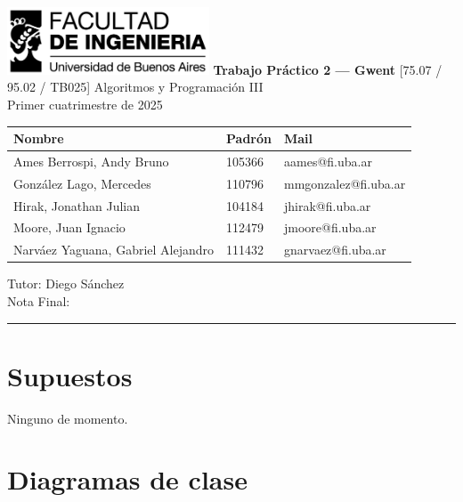\documentclass[titlepage,a4paper]{article}
\begin{document}
\begin{titlepage} %
	\hfill\includegraphics[width=6cm]{logofiuba.jpg}
    \centering
    \vfill
    \Huge \textbf{Trabajo Práctico 2 — Gwent}
    \vskip2cm
    \Large [75.07 / 95.02 / TB025] Algoritmos y Programación III\\
    Primer cuatrimestre de 2025 
    \vfill
    \begin{tabular}{ | l | l | l | }
      \hline
      \textbf{Nombre} & \textbf{Padrón} & \textbf{Mail} \\ \hline
      Ames Berrospi, Andy Bruno & 105366 & aames@fi.uba.ar \\ \hline
      González Lago, Mercedes & 110796 & mmgonzalez@fi.uba.ar \\ \hline
      Hirak, Jonathan Julian & 104184 & jhirak@fi.uba.ar \\ \hline
      Moore, Juan Ignacio & 112479 & jmoore@fi.uba.ar \\ \hline
      Narváez Yaguana, Gabriel Alejandro & 111432 & gnarvaez@fi.uba.ar \\ \hline
    \end{tabular}
    
    \vspace{1cm}
    \begin{flushleft}
    Tutor: Diego Sánchez \\
    \vspace{0.5cm}
    Nota Final: \rule{2cm}{0.4pt}
    \end{flushleft}
    \vfill
    \vfill
\end{titlepage}

\tableofcontents %
\newpage

\section{Supuestos}\label{sec:supuestos}

Ninguno de momento.

\section{Diagramas de clase}\label{sec:diagramasdeclase}
\end{document}
